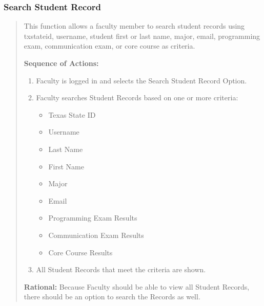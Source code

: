    \subsubsection{Search Student Record}
   \begin{quote} %
         This function allows a faculty member to search student records
         using txstateid, username, student first or last name, major,
         email, programming exam, communication exam, or core course as
         criteria.
         
         \textbf{Sequence of Actions:}
         \begin{enumerate}
            \item Faculty is logged in and selects the Search Student Record Option.
            \item Faculty searches Student Records based on one or more criteria:
               \begin{itemize}
                  \item Texas State ID
                  \item Username
                  \item Last Name
                  \item First Name
                  \item Major
                  \item Email
                  \item Programming Exam Results
                  \item Communication Exam Results
                  \item Core Course Results
               \end{itemize}
            \item All Student Records that meet the criteria are shown.
      \end{enumerate}

         \textbf{Rational:}
         Because Faculty should be able to view all Student Records, there
         should be an option to search the Records as well.
   \end{quote} %

